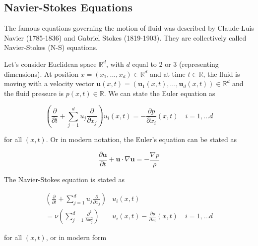 

\subsection{Navier-Stokes Equations}
The famous equations governing the motion of fluid was described by Claude-Luis Navier (1785-1836) and Gabriel Stokes (1819-1903). They are collectively called Navier-Stokes (N-S) equations.

Let's consider Euclidean space $\mathbb{R}^d$, with $d$ equal to 2 or 3 (representing dimensions). At position $x = (x_1,...,x_d) \in \mathbb{R}^d$ and at time $t \in \mathbb{R}$, the fluid is moving with a velocity vector $\bm{u}(x,t) = (\bm{u}_1(x,t),...,\bm{u}_d(x,t)) \in \mathbb{R}^d$ and the fluid pressure is $p(x,t) \in \mathbb{R}$. We can state the Euler equation as


\begin{equation} 
	\label{eqn:ee}
	\left(\frac{\partial}{\partial t} + \sum_{j=1}^{d} u_j \frac{\partial}{\partial x_j}\right) u_i(x,t) = - \frac{\partial p}{\partial x_i} (x,t) \quad  i = 1,...d
\end{equation}

for all $(x, t)$. Or in modern notation, the Euler's equation can be stated as

\begin{equation} 
	\label{eqn:ee-modern}
	\frac{\partial \bm{u}}{\partial t} + \bm{u} \cdot \nabla \bm{u} = - \frac{\nabla p}{\rho}
\end{equation}

The Navier-Stokes equation is stated as

\begin{align} 
	\label{eqn:ns}
	\left(\frac{\partial}{\partial t} + \sum_{j=1}^{d} u_j \frac{\partial}{\partial x_j}\right) &u_i(x,t) \\
	 = \nu \left(\sum_{j=1}^{d} \frac{\partial^2}{\partial x_j^2}\right) &u_i(x,t) - \frac{\partial p}{\partial x_i} (x,t) \quad  i = 1,...d
\end{align}

for all $(x, t)$, or in modern form


